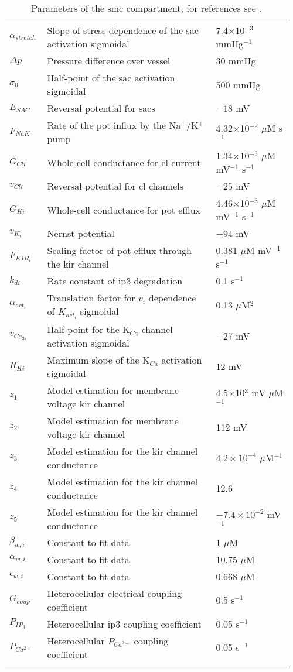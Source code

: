 \documentclass[11pt]{elsarticle}
\newcommand{\sodpot}{Na$^+$/K$^+$\xspace}
\newcommand{\mus}{$\mu$M s$^{-1}$\xspace}
\newcommand{\uM}{$\mu$M\xspace}
\newcommand{\n}{$^{-1}$\xspace}
\newcommand{\e}[1]{\times 10^{#1}}
\newcommand{\psec}{s$^{-1}$\xspace}
\newcommand{\pot}{\gls{pot}\xspace}
\newcommand{\cl}{\gls{cl}\xspace}
\newcommand{\ip}{\gls{ip3}\xspace}
\begin{document}
\begin{longtable}[h!]{ p{0.12\linewidth}   p{0.58\linewidth}   p{0.26\linewidth} }
$\alpha_{stretch}$ & Slope of stress dependence of the \gls{sac} activation sigmoidal	& 7.4$\times$10$^{-3}$ mmHg$^{-1}$ \\
$ \Delta p $			& Pressure difference over vessel								& 30 mmHg	\\
$\sigma_{0}$      		& Half-point of the \gls{sac} activation sigmoidal				& 500 mmHg	 \\
$E_{SAC}$      			& Reversal potential for \glspl{sac}							& $-18$ mV \\
$F_{NaK}$      			& Rate of the \pot influx by the \sodpot pump & 4.32$\times$10$^{-2}$ \mus \\
$G_{Cli}$      			& Whole-cell conductance for \cl current		& 1.34$\times$10$^{-3}$ \uM mV\n \psec\\
$v_{Cli}$      			& Reversal potential for \cl channels		& $-25$  mV \\
$G_{Ki}$      	& Whole-cell conductance for \pot efflux		& 4.46$\times$10$^{-3}$ \uM mV\n \psec \\
$v_{K_i}$      	& Nernst potential										& $-94$ mV	 \\
$ F_{KIR_{i}} $ & Scaling factor of \pot efflux through the \gls{kir} channel & 0.381 \uM mV\n \psec  \\
$k_{di}$      			& Rate constant of \ip degradation	& 0.1 \psec \\
$\alpha_{act_i}$ & Translation factor for $v_i$ dependence of $K_{act_{i}}$ sigmoidal	& 0.13 \uM$^2$ \\
$v_{Ca_{3i}}$   		& Half-point for the K$_{Ca}$ channel activation sigmoidal		& $-27$ mV	\\
$R_{Ki}$      			& Maximum slope of the K$_{Ca}$ activation sigmoidal				& 12 mV \\
$ z_1 $	& Model estimation for membrane voltage \gls{kir} channel			  & 4.5$\times$10$^3$ mV \uM\n\\
$ z_2 $	& Model estimation for membrane voltage \gls{kir} channel			  & 112 mV \\
$ z_3 $	& Model estimation for the \gls{kir} channel conductance			  & $4.2\e{-4}$ \uM\n  \\
$ z_4 $	& Model estimation for the \gls{kir} channel conductance			  & 12.6 \\
$ z_5 $	& Model estimation for the \gls{kir} channel conductance	 & $-7.4\e{-2}$ mV\n  \\
$\beta_{w,i}$ & Constant to fit data & 1 \uM \\
$\alpha_{w,i}$ & Constant to fit data & 10.75 \uM \\
$\epsilon_{w,i}$ & Constant to fit data & 0.668 \uM \\
$G_{coup}$      		& Heterocellular electrical coupling coefficient		& 0.5 \psec	 \\
$P_{IP_{3}}$      		& Heterocellular \ip coupling coefficient	& 0.05 \psec\\
$P_{Ca^{2+}}$      		& Heterocellular $P_{Ca^{2+}}$ coupling coefficient	& 0.05 \psec \\
  \hline
\caption{Parameters of the \gls{smc} compartment, for references see \citet{Dormanns2015}.}
\end{longtable}
\end{document}

